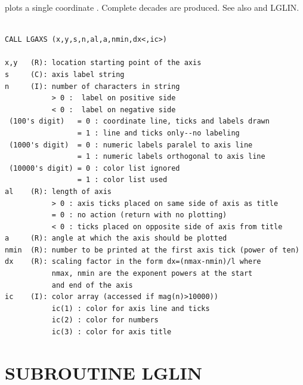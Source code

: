 \documentclass[11pt]{report}
\begin{document}
 plots a single  coordinate . Complete
decades are produced.  See also  and LGLIN.
\begin{verbatim}

CALL LGAXS (x,y,s,n,al,a,nmin,dx<,ic>)

x,y   (R): location starting point of the axis
s     (C): axis label string
n     (I): number of characters in string
           > 0 :  label on positive side
           < 0 :  label on negative side
 (100's digit)   = 0 : coordinate line, ticks and labels drawn
                 = 1 : line and ticks only--no labeling
 (1000's digit)  = 0 : numeric labels paralel to axis line
                 = 1 : numeric labels orthogonal to axis line
 (10000's digit) = 0 : color list ignored
                 = 1 : color list used
al    (R): length of axis
           > 0 : axis ticks placed on same side of axis as title
           = 0 : no action (return with no plotting)
           < 0 : ticks placed on opposite side of axis from title
a     (R): angle at which the axis should be plotted
nmin  (R): number to be printed at the first axis tick (power of ten)
dx    (R): scaling factor in the form dx=(nmax-nmin)/l where
           nmax, nmin are the exponent powers at the start
           and end of the axis
ic    (I): color array (accessed if mag(n)>10000))
           ic(1) : color for axis line and ticks
           ic(2) : color for numbers
           ic(3) : color for axis title
\end{verbatim}

\section{SUBROUTINE LGLIN}
\end{document}

